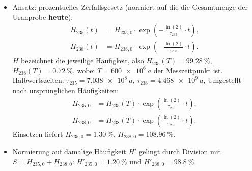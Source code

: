 \documentclass{subfiles}
\begin{document}
\subaufgabe{}
\begin{itemize}
        \item Ansatz: prozentuelles Zerfallsgesetz (normiert auf die die Gesamtmenge der Uranprobe \textbf{heute}):
        \begin{align*}
                H_{235}(t) &= H_{235,0}\cdot\exp(-\frac{\ln(2)}{\tau_{235}}\cdot t),\\
                H_{238}(t) &= H_{238,0}\cdot\exp(-\frac{\ln(2)}{\tau_{238}}\cdot t).
        \end{align*}
        $H$ bezeichnet die jeweilige Häufigkeit, also $H_{235}(T) = \SI{99.28}{\percent}$, $H_{238}(T) = \SI{0.72}{\percent}$, wobei $T=\SI{600e6}{a}$ der Messzeitpunkt ist. Halbwertszeiten: $\tau_{235}=\SI{7.038e8}{a}$, $\tau_{238}=\SI{4.468e9}{a}$, Umgestellt nach ursprünglichen Häufigkeiten:
        \begin{align*}
                H_{235,0} &= H_{235}(T)\cdot\exp(\frac{\ln(2)}{\tau_{235}}\cdot t),\\
                H_{238,0} &= H_{238}(T)\cdot\exp(\frac{\ln(2)}{\tau_{238}}\cdot t).
        \end{align*}
        Einsetzen liefert $H_{235,0} = \SI{1.30}{\percent}$, $H_{238,0} = \SI{108.96}{\percent}$.
        \item Normierung auf damalige Häufigkeit $H'$ gelingt durch Division mit $S=H_{235,0} + H_{238,0}$: \underline{$H'_{235,0}=\SI{1.20}{\percent}$ und $H'_{238,0}=\SI{98.8}{\percent}$}.
\end{itemize}
\end{document}
